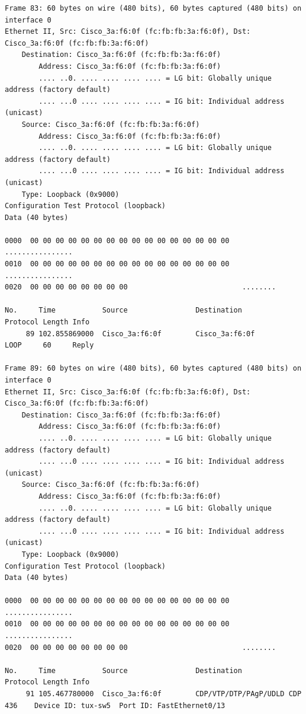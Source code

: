 \documentclass[a4paper,11pt]{article}
\begin{document}
\begin{lstlisting}
Frame 83: 60 bytes on wire (480 bits), 60 bytes captured (480 bits) on interface 0
Ethernet II, Src: Cisco_3a:f6:0f (fc:fb:fb:3a:f6:0f), Dst: Cisco_3a:f6:0f (fc:fb:fb:3a:f6:0f)
    Destination: Cisco_3a:f6:0f (fc:fb:fb:3a:f6:0f)
        Address: Cisco_3a:f6:0f (fc:fb:fb:3a:f6:0f)
        .... ..0. .... .... .... .... = LG bit: Globally unique address (factory default)
        .... ...0 .... .... .... .... = IG bit: Individual address (unicast)
    Source: Cisco_3a:f6:0f (fc:fb:fb:3a:f6:0f)
        Address: Cisco_3a:f6:0f (fc:fb:fb:3a:f6:0f)
        .... ..0. .... .... .... .... = LG bit: Globally unique address (factory default)
        .... ...0 .... .... .... .... = IG bit: Individual address (unicast)
    Type: Loopback (0x9000)
Configuration Test Protocol (loopback)
Data (40 bytes)

0000  00 00 00 00 00 00 00 00 00 00 00 00 00 00 00 00   ................
0010  00 00 00 00 00 00 00 00 00 00 00 00 00 00 00 00   ................
0020  00 00 00 00 00 00 00 00                           ........

No.     Time           Source                Destination           Protocol Length Info
     89 102.855869000  Cisco_3a:f6:0f        Cisco_3a:f6:0f        LOOP     60     Reply

Frame 89: 60 bytes on wire (480 bits), 60 bytes captured (480 bits) on interface 0
Ethernet II, Src: Cisco_3a:f6:0f (fc:fb:fb:3a:f6:0f), Dst: Cisco_3a:f6:0f (fc:fb:fb:3a:f6:0f)
    Destination: Cisco_3a:f6:0f (fc:fb:fb:3a:f6:0f)
        Address: Cisco_3a:f6:0f (fc:fb:fb:3a:f6:0f)
        .... ..0. .... .... .... .... = LG bit: Globally unique address (factory default)
        .... ...0 .... .... .... .... = IG bit: Individual address (unicast)
    Source: Cisco_3a:f6:0f (fc:fb:fb:3a:f6:0f)
        Address: Cisco_3a:f6:0f (fc:fb:fb:3a:f6:0f)
        .... ..0. .... .... .... .... = LG bit: Globally unique address (factory default)
        .... ...0 .... .... .... .... = IG bit: Individual address (unicast)
    Type: Loopback (0x9000)
Configuration Test Protocol (loopback)
Data (40 bytes)

0000  00 00 00 00 00 00 00 00 00 00 00 00 00 00 00 00   ................
0010  00 00 00 00 00 00 00 00 00 00 00 00 00 00 00 00   ................
0020  00 00 00 00 00 00 00 00                           ........

No.     Time           Source                Destination           Protocol Length Info
     91 105.467780000  Cisco_3a:f6:0f        CDP/VTP/DTP/PAgP/UDLD CDP      436    Device ID: tux-sw5  Port ID: FastEthernet0/13  


\end{lstlisting}
\end{document}
